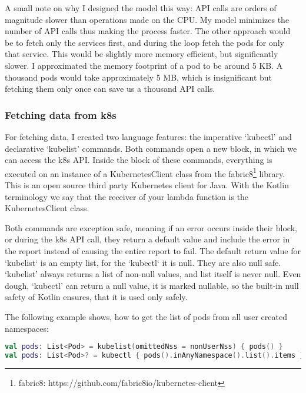A small note on why I designed the model this way: API calls are orders of magnitude slower than operations made on the CPU. My model minimizes the number of API calls thus making the process faster. The other approach would be to fetch only the services first, and during the loop fetch the pods for only that service. This would be slightly more memory efficient, but significantly slower. I approximated the memory footprint of a pod to be around 5 KB. A thousand pods would take approximately 5 MB, which is insignificant but fetching them only once can save us a thousand API calls.

\subsubsection{Fetching data from k8s}

For fetching data, I created two language features: the imperative `kubectl' and declarative `kubelist' commands. Both commands open a new block, in which we can access the k8s API. Inside the block of these commands, everything is executed on an instance of a KubernetesClient class from the fabric8\footnote{fabric8: https://github.com/fabric8io/kubernetes-client} library. This is an open source third party Kubernetes client for Java. With the Kotlin terminology we say that the receiver of your lambda function is the KubernetesClient class.

Both commands are exception safe, meaning if an error occurs inside their block, or during the k8s API call, they return a default value and include the error in the report instead of causing the entire report to fail. The default return value for `kubelist` is an empty list, for the `kubectl` it is null. They are also null safe. `kubelist' always returns a list of non-null values, and list itself is never null. Even dough, `kubectl' can return a null value, it is marked nullable, so the built-in null safety of Kotlin ensures, that it is used only safely.

The following example shows, how to get the list of pods from all user created namespaces:

\begin{lstlisting}[caption={Usage of kubelist and kubectl},language=Kotlin,label=code:kubelist_usage]
val pods: List<Pod> = kubelist(omittedNss = nonUserNss) { pods() }
val pods: List<Pod>? = kubectl { pods().inAnyNamespace().list().items }?.filter { it.metadata.namespace !in nonUserNss }
\end{lstlisting}

